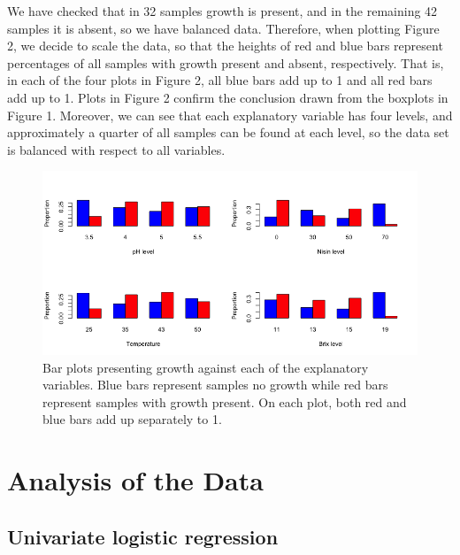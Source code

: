 \documentclass{article}
\begin{document}
We have checked that in 32 samples growth is present, and in the remaining 42 samples it is absent, so we have balanced data. Therefore, when plotting Figure 2, we decide to scale the data, so that the heights of red and blue  bars  represent percentages of all samples with growth present and absent, respectively. That is, in each of the four plots in Figure 2, all blue bars add up to 1 and all red bars add up to 1. Plots in Figure 2 confirm the conclusion drawn from the boxplots in Figure 1. Moreover, we can see that each explanatory variable has four levels, and approximately a quarter of all samples can be found at each level, so the data set is balanced with respect to all variables.  



\begin{figure}[h!]
\centering
\includegraphics[scale = 0.5]{proportions.png}
\caption{Bar plots presenting growth against each of the explanatory variables. Blue bars represent samples no growth while red bars represent samples with growth present. On each plot, both red and blue bars add up separately to 1. }
\end{figure}

\section{Analysis of the Data}

\subsection{Univariate logistic regression}
\end{document}

